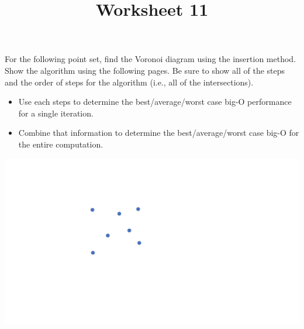 \documentclass[a4paper,12pt]{article}
\title{Worksheet 11}
\begin{document}
\maketitle

\worksheetGroundRules

\worksheetSubmission

\assignmentInstructions

For the following point set, find the Voronoi diagram using the insertion method. Show the algorithm using the following pages. Be sure to show all of the steps and the order of steps for the algorithm (i.e., all of the intersections).

\begin{itemize}

\item Use each steps to determine the best/average/worst case big-O performance for a single iteration. 
\item Combine that information to determine the best/average/worst case big-O for the entire computation.

\end{itemize}


\begin{center}
\includegraphics[width=0.65\linewidth]{../images/voronoi7.pdf}
\end{center}




\newpage
\end{document}

